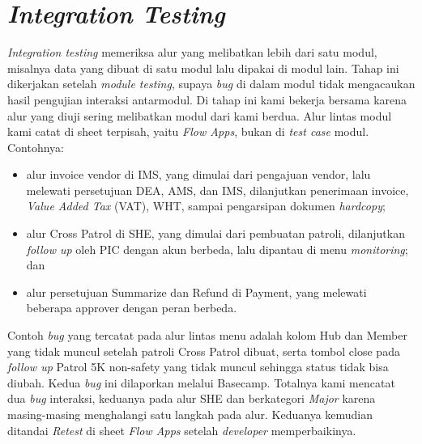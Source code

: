 \section{\textit{Integration Testing}}
\textit{Integration testing} memeriksa alur yang melibatkan lebih dari satu modul, misalnya data yang dibuat di satu modul lalu dipakai di modul lain. Tahap ini dikerjakan setelah \textit{module testing}, supaya \textit{bug} di dalam modul tidak mengacaukan hasil pengujian interaksi antarmodul. Di tahap ini kami bekerja bersama karena alur yang diuji sering melibatkan modul dari kami berdua. Alur lintas modul kami catat di sheet terpisah, yaitu \textit{Flow Apps}, bukan di \textit{test case} modul. Contohnya:
\begin{itemize}
\item alur invoice vendor di IMS, yang dimulai dari pengajuan vendor, lalu melewati persetujuan DEA, AMS, dan IMS, dilanjutkan penerimaan invoice, \textit{Value Added Tax}\label{ist:vat} (VAT), WHT, sampai pengarsipan dokumen \textit{hardcopy};
\item alur Cross Patrol di SHE, yang dimulai dari pembuatan patroli, dilanjutkan \textit{follow up} oleh PIC dengan akun berbeda, lalu dipantau di menu \textit{monitoring}; dan
\item alur persetujuan Summarize dan Refund di Payment, yang melewati beberapa approver dengan peran berbeda.
\end{itemize}
Contoh \textit{bug} yang tercatat pada alur lintas menu adalah kolom Hub dan Member yang tidak muncul setelah patroli Cross Patrol dibuat, serta tombol close pada \textit{follow up} Patrol 5K non-safety yang tidak muncul sehingga status tidak bisa diubah. Kedua \textit{bug} ini dilaporkan melalui Basecamp. Totalnya kami mencatat dua \textit{bug} interaksi, keduanya pada alur SHE dan berkategori \textit{Major} karena masing-masing menghalangi satu langkah pada alur. Keduanya kemudian ditandai \textit{Retest} di sheet \textit{Flow Apps} setelah \textit{developer} memperbaikinya.

